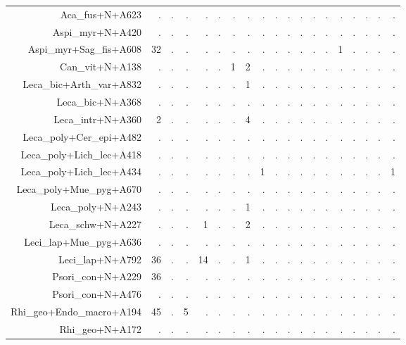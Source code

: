 \documentclass[a4paper, 11]{article}\usepackage[]{graphicx}\usepackage[]{color}
\begin{document}
\begin{table}
\begin{tabular}{rrrrrrrrrrrrrrrrrrr}
  \hline
Aca\_fus+N+A623 & . & . & . & . & . & . & . & . & . & . & . & . & . & . & . & . & . & . \\ 
  Aspi\_myr+N+A420 & . & . & . & . & . & . & . & . & . & . & . & . & . & . & . & . & . & . \\ 
  Aspi\_myr+Sag\_fis+A608 & 32 & . & . & . & . & . & . & . & . & . & . & . & . & 1 & . & . & . & . \\ 
  Can\_vit+N+A138 & . & . & . & . & . & 1 & 2 & . & . & . & . & . & . & . & . & . & . & . \\ 
  Leca\_bic+Arth\_var+A832 & . & . & . & . & . & . & 1 & . & . & . & . & . & . & . & . & . & . & . \\ 
  Leca\_bic+N+A368 & . & . & . & . & . & . & . & . & . & . & . & . & . & . & . & . & . & . \\ 
  Leca\_intr+N+A360 & 2 & . & . & . & . & . & 4 & . & . & . & . & . & . & . & . & . & . & . \\ 
  Leca\_poly+Cer\_epi+A482 & . & . & . & . & . & . & . & . & . & . & . & . & . & . & . & . & . & . \\ 
  Leca\_poly+Lich\_lec+A418 & . & . & . & . & . & . & . & . & . & . & . & . & . & . & . & . & . & . \\ 
  Leca\_poly+Lich\_lec+A434 & . & . & . & . & . & . & . & 1 & . & . & . & . & . & . & . & . & . & 1 \\ 
  Leca\_poly+Mue\_pyg+A670 & . & . & . & . & . & . & . & . & . & . & . & . & . & . & . & . & . & . \\ 
  Leca\_poly+N+A243 & . & . & . & . & . & . & 1 & . & . & . & . & . & . & . & . & . & . & . \\ 
  Leca\_schw+N+A227 & . & . & . & 1 & . & . & 2 & . & . & . & . & . & . & . & . & . & . & . \\ 
  Leci\_lap+Mue\_pyg+A636 & . & . & . & . & . & . & . & . & . & . & . & . & . & . & . & . & . & . \\ 
  Leci\_lap+N+A792 & 36 & . & . & 14 & . & . & 1 & . & . & . & . & . & . & . & . & . & . & . \\ 
  Psori\_con+N+A229 & 36 & . & . & . & . & . & . & . & . & . & . & . & . & . & . & . & . & . \\ 
  Psori\_con+N+A476 & . & . & . & . & . & . & . & . & . & . & . & . & . & . & . & . & . & . \\ 
  Rhi\_geo+Endo\_macro+A194 & 45 & . & 5 & . & . & . & . & . & . & . & . & . & . & . & . & . & . & . \\ 
  Rhi\_geo+N+A172 & . & . & . & . & . & . & . & . & . & . & . & . & . & . & . & . & . & . \\ 

\end{tabular}
\end{table}
\end{document}
